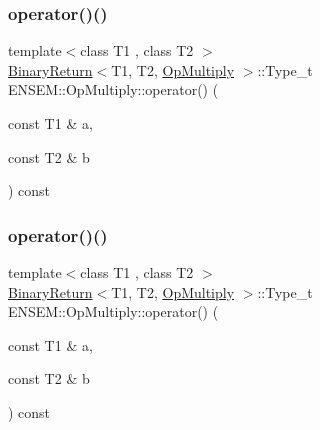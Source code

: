 \subsubsection{\texorpdfstring{operator()()}{operator()()}\hspace{0.1cm}{\footnotesize\ttfamily [1/3]}}
{\footnotesize\ttfamily template$<$class T1 , class T2 $>$ \\
\mbox{\hyperlink{structENSEM_1_1BinaryReturn}{Binary\+Return}}$<$T1, T2, \mbox{\hyperlink{structENSEM_1_1OpMultiply}{Op\+Multiply}} $>$\+::Type\+\_\+t E\+N\+S\+E\+M\+::\+Op\+Multiply\+::operator() (\begin{DoxyParamCaption}\item[{const T1 \&}]{a,  }\item[{const T2 \&}]{b }\end{DoxyParamCaption}) const\hspace{0.3cm}{\ttfamily [inline]}}

\mbox{\label{structENSEM_1_1OpMultiply_ae4e6438a01cae970041fa80c1cb6b594}} 
\subsubsection{\texorpdfstring{operator()()}{operator()()}\hspace{0.1cm}{\footnotesize\ttfamily [2/3]}}
{\footnotesize\ttfamily template$<$class T1 , class T2 $>$ \\
\mbox{\hyperlink{structENSEM_1_1BinaryReturn}{Binary\+Return}}$<$T1, T2, \mbox{\hyperlink{structENSEM_1_1OpMultiply}{Op\+Multiply}} $>$\+::Type\+\_\+t E\+N\+S\+E\+M\+::\+Op\+Multiply\+::operator() (\begin{DoxyParamCaption}\item[{const T1 \&}]{a,  }\item[{const T2 \&}]{b }\end{DoxyParamCaption}) const\hspace{0.3cm}{\ttfamily [inline]}}

\mbox{\label{structENSEM_1_1OpMultiply_ae4e6438a01cae970041fa80c1cb6b594}} 
